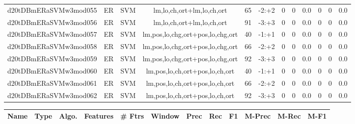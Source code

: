 \documentclass[a4paper]{article}
\begin{document}
\begin{landscape}
\begin{center}
\begin{tabular}{ |c|c|c|c|c|c|c|c|c|c|c|c|}
 
 	
 	\small{ d20tDBmERaSVMw3mod055 } & ER & SVM & lm,lo,ch,ort+lm,lo,ch,ort  &  65 &  -2:+2  &  0 & 0 & 0.0  &  0 & 0 & 0.0 \\
 	

 
 	
 	\small{ d20tDBmERaSVMw3mod056 } & ER & SVM & lm,lo,ch,ort+lm,lo,ch,ort  &  91 &  -3:+3  &  0 & 0 & 0.0  &  0 & 0 & 0.0 \\
 	

 
 	
 	\small{ d20tDBmERaSVMw3mod057 } & ER & SVM & lm,pos,lo,chg,ort+pos,lo,chg,ort  &  40 &  -1:+1  &  0 & 0 & 0.0  &  0 & 0 & 0.0 \\
 	

 
 	
 	\small{ d20tDBmERaSVMw3mod058 } & ER & SVM & lm,pos,lo,chg,ort+pos,lo,chg,ort  &  66 &  -2:+2  &  0 & 0 & 0.0  &  0 & 0 & 0.0 \\
 	

 
 	
 	\small{ d20tDBmERaSVMw3mod059 } & ER & SVM & lm,pos,lo,chg,ort+pos,lo,chg,ort  &  92 &  -3:+3  &  0 & 0 & 0.0  &  0 & 0 & 0.0 \\
 	

 
 	
 	\small{ d20tDBmERaSVMw3mod060 } & ER & SVM & lm,pos,lo,ch,ort+pos,lo,ch,ort  &  40 &  -1:+1  &  0 & 0 & 0.0  &  0 & 0 & 0.0 \\
 	

 
 	
 	\small{ d20tDBmERaSVMw3mod061 } & ER & SVM & lm,pos,lo,ch,ort+pos,lo,ch,ort  &  66 &  -2:+2  &  0 & 0 & 0.0  &  0 & 0 & 0.0 \\
 	

 
 	
 	\small{ d20tDBmERaSVMw3mod062 } & ER & SVM & lm,pos,lo,ch,ort+pos,lo,ch,ort  &  92 &  -3:+3  &  0 & 0 & 0.0  &  0 & 0 & 0.0 \\
 	
 \hline
\end{tabular}
\end{center}




\begin{center}
\begin{tabular}{ |c|c|c|c|c|c|c|c|c|c|c|c|} 
 \hline
 	Name & Type & Algo. & Features & \# Ftrs & Window & Prec & Rec & F1 & M-Prec & M-Rec & M-F1\\
 \hline

 	

 
 	

\end{tabular}
\end{center}
\end{landscape}
\end{document}
